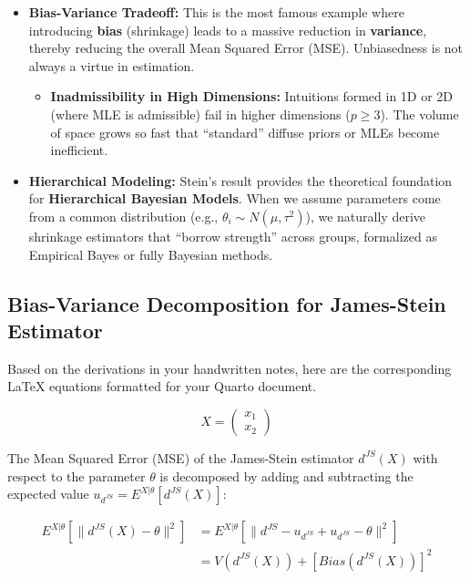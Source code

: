 \documentclass[
  letterpaper,
  DIV=11,
  numbers=noendperiod]{scrreprt}
\providecommand{\tightlist}{%
  \setlength{\itemsep}{0pt}\setlength{\parskip}{0pt}}
\renewcommand{\[}{\begin{equation}}
\renewcommand{\]}{\end{equation}}
\theoremstyle{definition}
\theoremstyle{plain}
\theoremstyle{plain}
\theoremstyle{plain}
\theoremstyle{definition}
\theoremstyle{plain}
\theoremstyle{remark}
\begin{document}
\begin{itemize}
\tightlist
\item
  \textbf{Bias-Variance Tradeoff:} This is the most famous example where
  introducing \textbf{bias} (shrinkage) leads to a massive reduction in
  \textbf{variance}, thereby reducing the overall Mean Squared Error
  (MSE). Unbiasedness is not always a virtue in estimation.

  \begin{itemize}
  \tightlist
  \item
    \textbf{Inadmissibility in High Dimensions:} Intuitions formed in 1D
    or 2D (where MLE is admissible) fail in higher dimensions
    (\(p \ge 3\)). The volume of space grows so fast that ``standard''
    diffuse priors or MLEs become inefficient.
  \end{itemize}
\item
  \textbf{Hierarchical Modeling:} Stein's result provides the
  theoretical foundation for \textbf{Hierarchical Bayesian Models}. When
  we assume parameters come from a common distribution (e.g.,
  \(\theta_i \sim N(\mu, \tau^2)\)), we naturally derive shrinkage
  estimators that ``borrow strength'' across groups, formalized as
  Empirical Bayes or fully Bayesian methods.
\end{itemize}

\subsection{Bias-Variance Decomposition for James-Stein
Estimator}\label{bias-variance-decomposition-for-james-stein-estimator}

Based on the derivations in your handwritten notes, here are the
corresponding LaTeX equations formatted for your Quarto document.

\[
X = \begin{pmatrix} x_1 \\ x_2 \end{pmatrix}
\]

The Mean Squared Error (MSE) of the James-Stein estimator \(d^{JS}(X)\)
with respect to the parameter \(\theta\) is decomposed by adding and
subtracting the expected value \(u_{d^{JS}} = E^{X|\theta}[d^{JS}(X)]\):

\[
\begin{aligned}
E^{X|\theta} \left[ \| d^{JS}(X) - \theta \|^2 \right] &= E^{X|\theta} \left[ \| d^{JS} - u_{d^{JS}} + u_{d^{JS}} - \theta \|^2 \right] \\
&= V(d^{JS}(X)) + \left[ Bias(d^{JS}(X)) \right]^2
\end{aligned}
\]
\end{document}

